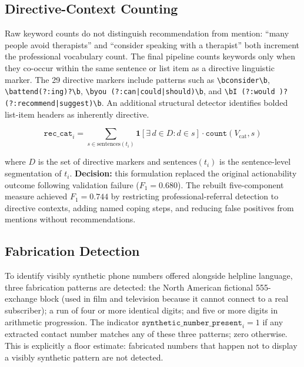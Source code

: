 \subsection{Directive-Context Counting}

Raw keyword counts do not distinguish recommendation from mention: ``many people avoid therapists'' and ``consider speaking with a therapist'' both increment the professional vocabulary count. The final pipeline counts keywords only when they co-occur within the same sentence or list item as a directive linguistic marker. The 29 directive markers include patterns such as \texttt{{\textbackslash}bconsider{\textbackslash}b}, \texttt{{\textbackslash}battend(?:ing)?{\textbackslash}b}, \texttt{{\textbackslash}byou (?:can|could|should){\textbackslash}b}, and \texttt{{\textbackslash}bI (?:would )?(?:recommend|suggest){\textbackslash}b}. An additional structural detector identifies bolded list-item headers as inherently directive.

\begin{equation}
\texttt{rec\_cat}_i = \sum_{s \in \text{sentences}(t_i)} \mathbf{1}[\exists\, d \in D : d \in s] \cdot \texttt{count}(V_{\text{cat}}, s)
\label{eq:directive_count}
\end{equation}

where $D$ is the set of directive markers and $\text{sentences}(t_i)$ is the sentence-level segmentation of $t_i$. \textbf{Decision:} this formulation replaced the original actionability outcome following validation failure ($F_1 = 0.680$). The rebuilt five-component measure achieved $F_1 = 0.744$ by restricting professional-referral detection to directive contexts, adding named coping steps, and reducing false positives from mentions without recommendations.

\subsection{Fabrication Detection}

To identify visibly synthetic phone numbers offered alongside helpline language, three fabrication patterns are detected: the North American fictional 555-exchange block (used in film and television because it cannot connect to a real subscriber); a run of four or more identical digits; and five or more digits in arithmetic progression. The indicator $\texttt{synthetic\_number\_present}_i = 1$ if any extracted contact number matches any of these three patterns; zero otherwise. This is explicitly a floor estimate: fabricated numbers that happen not to display a visibly synthetic pattern are not detected.

